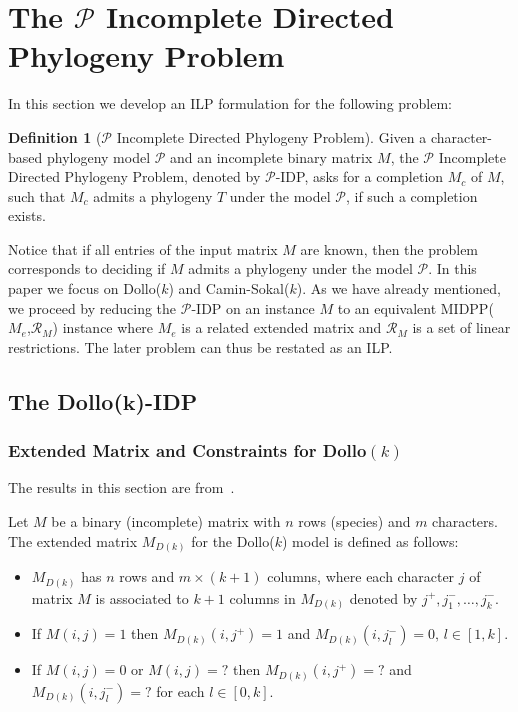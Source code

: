 \documentclass[a4paper,USenglish]{article}
\theoremstyle{definition}
\newtheorem{definition}{Definition}
\begin{document}
\section{The $\boldsymbol{\mathcal P}$ Incomplete Directed Phylogeny 
    Problem }
  \label{sec:ILP_general}

In  this section  we  develop  an ILP  formulation  for  the following  
problem:

\begin{definition}[${\mathcal P}$ Incomplete Directed Phylogeny 
    Problem]
  \label{definition:p-idpp}
Given a character-based phylogeny model $\mathcal P$ and an incomplete binary matrix
$M$, the ${\mathcal P}$ Incomplete Directed Phylogeny 
Problem, denoted by $\mathcal P$-IDP, asks for a
completion $M_{c}$ of $M$, such that $M_{c}$ admits a phylogeny $T$ under 
    the model $\mathcal P$, if such a completion exists.
%
\end{definition}
 
Notice that if all entries of the input matrix $M$ are
known,  then the  problem corresponds  to deciding  if $M$  admits a phylogeny
under the model $\mathcal P$.  
In this paper we focus on Dollo($k$) and Camin-Sokal($k$).
As  we have  already  mentioned, we  proceed by  reducing  the $\mathcal  P$-IDP
on an instance $M$ to an equivalent MIDPP($M_e$,$\mathcal R_M$) instance where 
$M_e$  is a  related extended  matrix  and $\mathcal  R_M$  is a  set of  linear
restrictions. The later problem can thus be restated as an ILP. 
  
\subsection{The Dollo($\boldsymbol{k}$)-IDP} 
\label{sec:ilp_Dollo}

  \subsubsection{Extended        Matrix        and        Constraints        for
    Dollo$(k)$}\label{sec:dollok_M}

The results in this section are from~\cite{Bonizzoni:2017:BPP:3107411.3107441}.

  
Let  $M$ be a binary (incomplete) matrix with $n$ rows (species) and $m$ characters.  
The extended matrix $M_{D(k)}$ for the Dollo($k$) model is defined as
follows:  
\begin{itemize}
  \item $M_{D(k)}$ has $n$ rows and  $m\times(k+1)$ columns, where each
    character $j$ of matrix $M$ is associated to $k+1$ columns in  $M_{D(k)}$
    denoted by  $j^{+},j^{-}_1,\ldots,j^{-}_{k}$. 
  \item If $M(i,j)=1$
    then $M_{D(k)}(i,j^{+})=1$ and $M_{D(k)}(i,j^{-}_l)=0,\, l\in [1,k]$.
  \item If  $M(i,j)=0$ or  $M(i,j)=?$ then $M_{D(k)}(i,j^{+})=?$ and
    $M_{D(k)}(i,j^{-}_l)=?$  for each  $l \in [0,k]$. 
  \end{itemize}
\end{document}
